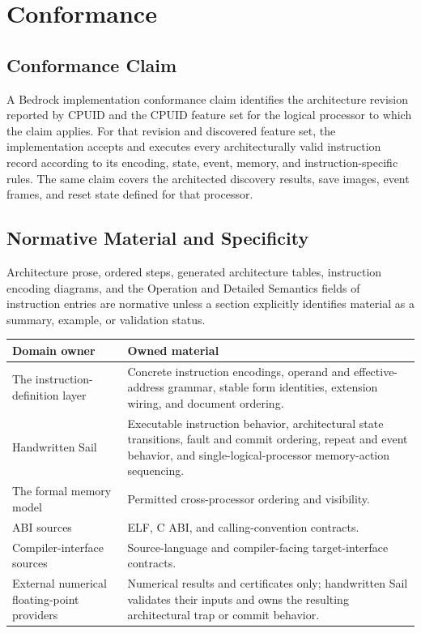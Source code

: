 \clearpage
\section{Conformance}\label{page:conformance}

\subsection{Conformance Claim}

A Bedrock implementation conformance claim identifies the architecture revision reported by CPUID and the CPUID
feature set for the logical processor to which the claim applies. For that revision and discovered feature set,
the implementation accepts and executes every architecturally valid instruction record according to its encoding,
state, event, memory, and instruction-specific rules. The same claim covers the architected discovery results,
save images, event frames, and reset state defined for that processor.

\subsection{Normative Material and Specificity}

Architecture prose, ordered steps, generated architecture tables, instruction encoding diagrams, and the Operation
and Detailed Semantics fields of instruction entries are normative unless a section explicitly identifies material
as a summary, example, or validation status.

\noindent
\begin{tabularx}{\linewidth}{@{}>{\raggedright\arraybackslash}p{1.55in}X@{}}
\toprule
\textbf{Domain owner} & \textbf{Owned material}\\
\midrule
The instruction-definition layer & Concrete instruction encodings, operand and effective-address grammar, stable form
identities, extension wiring, and document ordering.\\
Handwritten Sail & Executable instruction behavior, architectural state transitions, fault and commit ordering,
repeat and event behavior, and single-logical-processor memory-action sequencing.\\
The formal memory model & Permitted cross-processor ordering and visibility.\\
ABI sources & ELF, C ABI, and calling-convention contracts.\\
Compiler-interface sources & Source-language and compiler-facing target-interface contracts.\\
External numerical floating-point providers & Numerical results and certificates only; handwritten Sail validates
their inputs and owns the resulting architectural trap or commit behavior.\\
\bottomrule
\end{tabularx}

